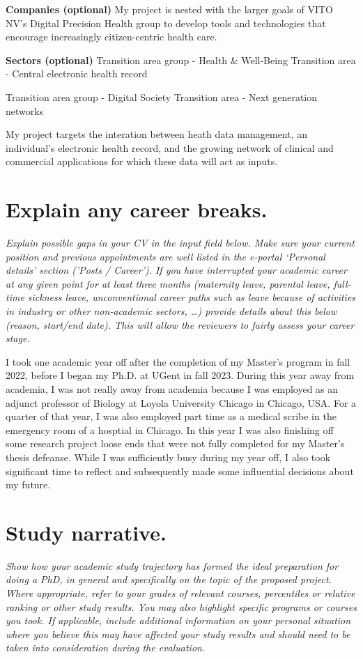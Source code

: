 \textbf{Companies (optional)}
My project is nested with the larger goals of VITO NV's Digital Precision Health group to develop tools and technologies that encourage increasingly citizen-centric health care.

\textbf{Sectors (optional)}
Transition area group - Health & Well-Being
Transition area - Central electronic health record

Transition area group - Digital Society
Transition area - Next generation networks

My project targets the interation between heath data management, an individual's electronic health record, and the growing network of clinical and commercial applications for which these data will act as inputs.


\section{Explain any career breaks.}
\textit{
Explain possible gaps in your CV in the input field below. 
Make sure your current position and previous appointments are well listed in the e-portal ‘Personal details’ section (’Posts / Career’). 
If you have interrupted your academic career at any given point for at least three months (maternity leave, parental leave, full-time sickness leave, unconventional career paths such as leave because of activities in industry or other non-academic sectors, …) provide details about this below (reason, start/end date). This will allow the reviewers to fairly assess your career stage.
}

I took one academic year off after the completion of my Master's program in fall 2022, before I began my Ph.D. at UGent in fall 2023. 
During this year away from academia, I was not really away from academia because I was employed as an adjunct professor of Biology at Loyola University Chicago in Chicago, USA.
For a quarter of that year, I was also employed part time as a medical scribe in the emergency room of a hosptial in Chicago.
In this year I was also finishing off some research project loose ends that were not fully completed for my Master's thesis defeanse.
While I was sufficiently busy during my year off, I also took significant time to reflect and subsequently made some influential decisions about my future.

\section{Study narrative.}
\textit{
Show how your academic study trajectory has formed the ideal preparation for doing a PhD, in general and specifically on the topic of the proposed project. Where appropriate, refer to your grades of relevant courses, percentiles or relative ranking or other study results. You may also highlight specific programs or courses you took. If applicable, include additional information on your personal situation where you believe this may have affected your study results and should need to be taken into consideration during the evaluation.
}



